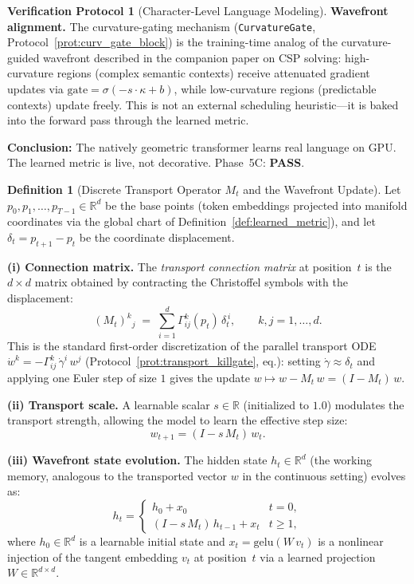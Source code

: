 \documentclass[11pt,a4paper]{article}
\theoremstyle{definition}
\newtheorem{definition}[theorem]{Definition}
\newtheorem{protocol}[theorem]{Verification Protocol}
\theoremstyle{remark}
\newcommand{\R}{\mathbb{R}}
\begin{document}
\begin{protocol}[Character-Level Language Modeling]
\textbf{Wavefront alignment.} The curvature-gating mechanism 
(\texttt{CurvatureGate}, Protocol~\ref{prot:curv_gate_block}) is the 
training-time analog of the curvature-guided wavefront described 
in the companion paper on CSP solving: high-curvature regions 
(complex semantic contexts) receive attenuated gradient updates 
via $\mathrm{gate} = \sigma(-s \cdot \kappa + b)$, while 
low-curvature regions (predictable contexts) update freely. 
This is not an external scheduling heuristic---it is baked into 
the forward pass through the learned metric.

\textbf{Conclusion:} The natively geometric transformer learns 
real language on GPU. The learned metric is live, not decorative.
Phase~5C: \textbf{PASS}.
\end{protocol}


\begin{definition}[Discrete Transport Operator $M_t$ and 
the Wavefront Update]\label{def:transport_operator}
Let $p_0, p_1, \ldots, p_{T-1} \in \R^d$ be the base points 
(token embeddings projected into manifold coordinates via the 
global chart of Definition~\ref{def:learned_metric}), and let 
$\delta_t = p_{t+1} - p_t$ be the coordinate displacement.

\textbf{(i) Connection matrix.} The \emph{transport connection 
matrix} at position~$t$ is the $d \times d$ matrix obtained by 
contracting the Christoffel symbols with the displacement:
\begin{equation}\label{eq:transport_matrix}
  (M_t)^k{}_j \;=\; 
  \sum_{i=1}^{d} \Gamma^k_{ij}(p_t)\, \delta_t^{\,i},
  \qquad k, j = 1, \ldots, d.
\end{equation}
This is the standard first-order discretization of the parallel 
transport ODE $\dot{w}^k = -\Gamma^k_{ij}\, \dot\gamma^i\, w^j$ 
(Protocol~\ref{prot:transport_killgate}, eq.): setting 
$\dot\gamma \approx \delta_t$ and applying one Euler step of size 
$1$ gives the update $w \mapsto w - M_t\, w = (I - M_t)\, w$.

\textbf{(ii) Transport scale.} A learnable scalar 
$s \in \R$ (initialized to $1.0$) modulates the transport 
strength, allowing the model to learn the effective step size:
\begin{equation}\label{eq:transport_scale}
  w_{t+1} = (I - s\, M_t)\, w_t.
\end{equation}

\textbf{(iii) Wavefront state evolution.} The hidden state 
$h_t \in \R^d$ (the working memory, analogous to the transported 
vector $w$ in the continuous setting) evolves as:
\begin{equation}\label{eq:wavefront_update}
  h_t = 
  \begin{cases}
    h_0 + x_0 & t = 0, \\[4pt]
    (I - s\, M_t)\, h_{t-1} + x_t & t \geq 1,
  \end{cases}
\end{equation}
where $h_0 \in \R^d$ is a learnable initial state and 
$x_t = \mathrm{gelu}(W\, v_t)$ is a nonlinear injection of the 
tangent embedding $v_t$ at position~$t$ via a learned projection 
$W \in \R^{d \times d}$.


\end{definition}
\end{document}
